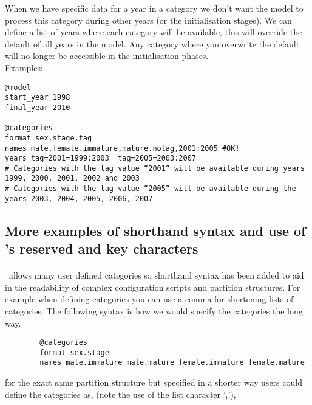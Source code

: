 When we have specific data for a year in a category we don't want the model to process this category during other years (or the initialisation stages). We can define a list of years where each category will be available, this will override the default of all years in the model. Any category where you overwrite the default will no longer be accessible in the initialisation phases.
\\
Examples:
{\small{\begin{verbatim}
@model
start_year 1998
final_year 2010

@categories
format sex.stage.tag
names male,female.immature,mature.notag,2001:2005 #OK!
years tag=2001=1999:2003  tag=2005=2003:2007
# Categories with the tag value “2001” will be available during years 1999, 2000, 2001, 2002 and 2003
# Categories with the tag value “2005” will be available during the years 2003, 2004, 2005, 2006, 2007
\end{verbatim}}}


\subsection{\label{example1}}




\subsection{More examples of shorthand syntax and use of \CNAME's reserved and key characters}\label{sec:ShorthandSyntax-section}
\paragraph*{\label{sub:categories}}
\CNAME\ allows many user defined categories so shorthand syntax has been added to aid in the readability of complex configuration scripts and partition structures. For example when defining categories you can use a comma for shortening lists of categories. The following syntax is how we would specify the categories the long way.
{\small{\begin{verbatim}
		@categories 
		format sex.stage
		names male.immature male.mature female.immature female.mature		
		\end{verbatim}}}	

for the exact same partition structure but specified in a shorter way users could define the categories as, (note the use of the list character ','),


